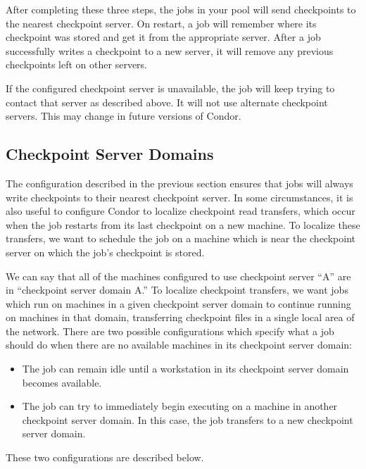 After completing these three steps, the jobs in your pool will
send checkpoints to the nearest checkpoint server.
On restart, a job will remember where its checkpoint was
stored and get it from the appropriate server.
After a job successfully writes a checkpoint to a new server, it will
remove any previous checkpoints left on other servers.

\Note If the configured checkpoint server is unavailable, the job will
keep trying to contact that server as described above.
It will not use alternate checkpoint servers.
This may change in future versions of Condor.

\subsection{\label{Checkpoint-Server-Domains} 
Checkpoint Server Domains}

The configuration described in the previous section ensures that jobs
will always write checkpoints to their nearest checkpoint server.  In
some circumstances, it is also useful to configure Condor to localize
checkpoint read transfers, which occur when the job restarts from its
last checkpoint on a new machine.  To localize these transfers, we
want to schedule the job on a machine which is near the checkpoint
server on which the job's checkpoint is stored.

We can say that all of the machines configured to use checkpoint
server ``A'' are in ``checkpoint server domain A.''  To localize
checkpoint transfers, we want jobs which run on machines in a given
checkpoint server domain to continue running on machines in that
domain, transferring checkpoint files in a single local area of the
network.  There are two possible configurations which specify what a
job should do when there are no available machines in its checkpoint
server domain:
\begin{itemize}
\item The job can remain idle until a workstation in its checkpoint
server domain becomes available.
\item The job can try to immediately begin executing on a machine
in another checkpoint server domain.  In this case, the job transfers
to a new checkpoint server domain.
\end{itemize}
These two configurations are described below.

